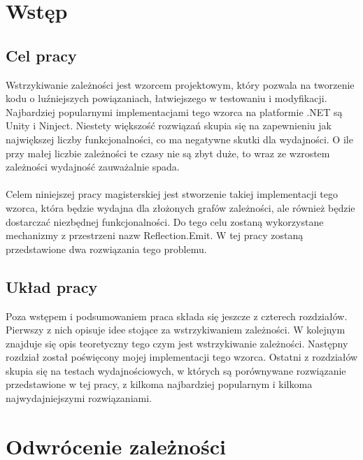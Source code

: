 \documentclass[12pt]{article}
\begin{document}
\clearpage
\tableofcontents


\clearpage
\section{Wstęp}
\subsection{Cel pracy}
Wstrzykiwanie zależności jest wzorcem projektowym, który pozwala na tworzenie kodu o luźniejszych powiązaniach, łatwiejszego w testowaniu i modyfikacji. Najbardziej popularnymi implementacjami tego wzorca na platformie .NET są Unity i Ninject. Niestety większość rozwiązań skupia się na zapewnieniu jak największej liczby funkcjonalności, co ma negatywne skutki dla wydajności. O ile przy małej liczbie zależności te czasy nie są zbyt duże, to wraz ze wzrostem zależności wydajność zauważalnie spada.\\
\\
Celem niniejszej pracy magisterskiej jest stworzenie takiej implementacji tego wzorca, która będzie wydajna dla złożonych grafów zależności, ale również będzie dostarczać niezbędnej funkcjonalności. Do tego celu zostaną wykorzystane mechanizmy z przestrzeni nazw Reflection.Emit. W tej pracy zostaną przedstawione dwa rozwiązania tego problemu.

\subsection{Układ pracy}
Poza wstępem i podsumowaniem praca składa się jeszcze z czterech rozdziałów. Pierwszy z nich opisuje idee stojące za wstrzykiwaniem zależności. W kolejnym znajduje się opis teoretyczny tego czym jest wstrzykiwanie zależności. Następny rozdział został poświęcony mojej implementacji tego wzorca. Ostatni z rozdziałów skupia się na testach wydajnościowych, w których są porównywane rozwiązanie przedstawione w tej pracy, z kilkoma najbardziej popularnym i kilkoma najwydajniejszymi rozwiązaniami.



\clearpage
\section{Odwrócenie zależności}
\end{document}
